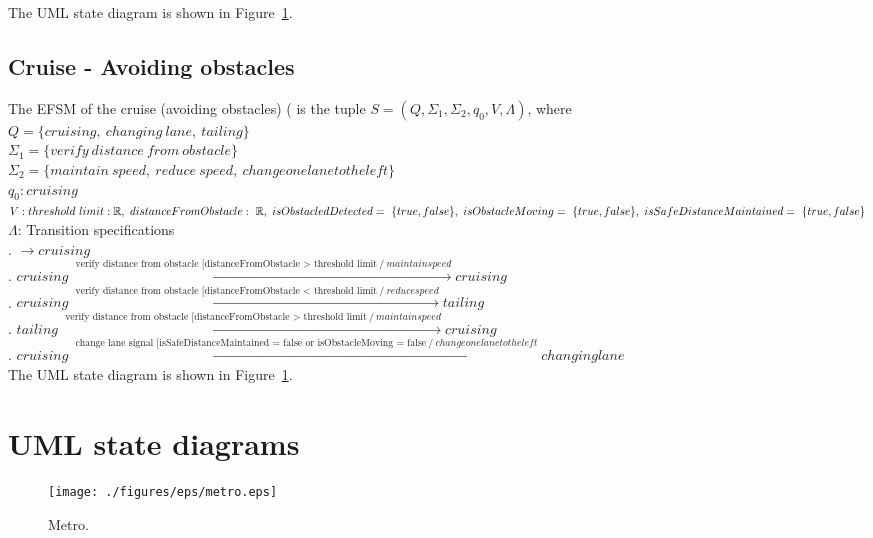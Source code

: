 \documentclass[12pt]{article}
\begin{document}
\begin{spacing}{1.5}
\noindent The UML state diagram is shown in Figure~\ref{fig:metro-fig}.
\newpage

\subsection{Cruise - Avoiding obstacles}

\noindent The EFSM of the cruise (avoiding obstacles) ( is the tuple $S = (Q, \Sigma_1, \Sigma_2, q_0, V, \Lambda)$, where\\

\noindent $Q = \{cruising,~changing~lane,~tailing\}$\\
\noindent $\Sigma_1 = \{verify~distance~from~obstacle\}$\\
\noindent $\Sigma_2 = \{maintain~speed,~reduce~speed,~change one lane to the left\}$\\
\noindent $q_0: cruising$\\
\noindent $V: threshold~limit: \mathbb R,~distanceFromObstacle:~ \mathbb R,~isObstacledDetected=~\{true, false\},\newline~isObstacleMoving=~\{true,false\},~isSafeDistanceMaintained=~\{true,false\}$\\
\noindent $\Lambda$: Transition specifications\\
. $\rightarrow cruising$\\
. $cruising \xrightarrow {\text { verify distance from obstacle [distanceFromObstacle > threshold limit}~/ ~maintain speed} cruising$\\
. $cruising \xrightarrow {\text { verify distance from obstacle [distanceFromObstacle < threshold limit}~/ ~reduce speed} tailing$\\
. $tailing \xrightarrow {\text { verify distance from obstacle [distanceFromObstacle > threshold limit}~/ ~maintain speed} cruising$\\
. $cruising \xrightarrow {\text { change lane signal [isSafeDistanceMaintained = false or isObstacleMoving = false}~/ ~change one lane to the left} changing lane$\\


\noindent The UML state diagram is shown in Figure~\ref{fig:metro-fig}.

\newpage
\section{UML state diagrams}

\begin{figure}[h!]
	\centering
		\texttt{[image: ./figures/eps/metro.eps]}
		  \caption{Metro.}
  \label{fig:metro-fig}
\end{figure}

\end{spacing}
\end{document}
